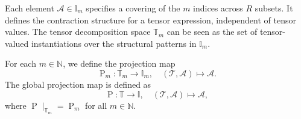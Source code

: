 \documentclass[letterpaper,11pt]{article}
\newcommand{\mytensorspace}{\mathbb{T}}
\newcommand{\mytensorspacep}[1]{\mathbb{T}_{#1}}
\newcommand{\myindexspace}{\mathbb{I}}
\newcommand{\myindexspacep}[1]{\mathbb{I}_{#1}}
\newcommand{\projectionindex}{\operatorname{P}}
\newcommand{\projectionindexp}[1]{\operatorname{P}_{#1}}
\begin{document}
\begin{remark}
Each element $\mathcal{A} \in \myindexspacep{m}$ specifies a covering of the $m$ indices across $R$ subsets. It defines the contraction structure for a tensor expression, independent of tensor values. The tensor decomposition space $\mytensorspacep{m}$ can be seen as the set of tensor-valued instantiations over the structural patterns in $\myindexspacep{m}$.
\end{remark}


\begin{definition}\label{def:projection_tensor_to_index}
For each $m \in \mathbb{N}$, we define the projection map
\begin{equation}
\projectionindexp{m}: \mytensorspacep{m} \to \myindexspacep{m}, \quad (\mathcal{T}, \mathcal{A}) \mapsto \mathcal{A}.
\end{equation}
The global projection map is defined as
\begin{equation}
\projectionindex : \mytensorspace \to \myindexspace, \quad (\mathcal{T}, \mathcal{A}) \mapsto \mathcal{A},
\end{equation}
where $\projectionindex \mid_{\mytensorspacep{m}} = \projectionindexp{m}$ for all $m \in \mathbb{N}$.
\end{definition}
\end{document}
